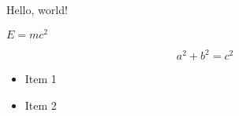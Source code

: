 \documentclass{article}
\begin{document}
Hello, world!

$E=mc^2$

\begin{equation}
a^2 + b^2 = c^2
\end{equation}

\begin{itemize}
    \item Item 1
    \item Item 2
\end{itemize}
\end{document}
